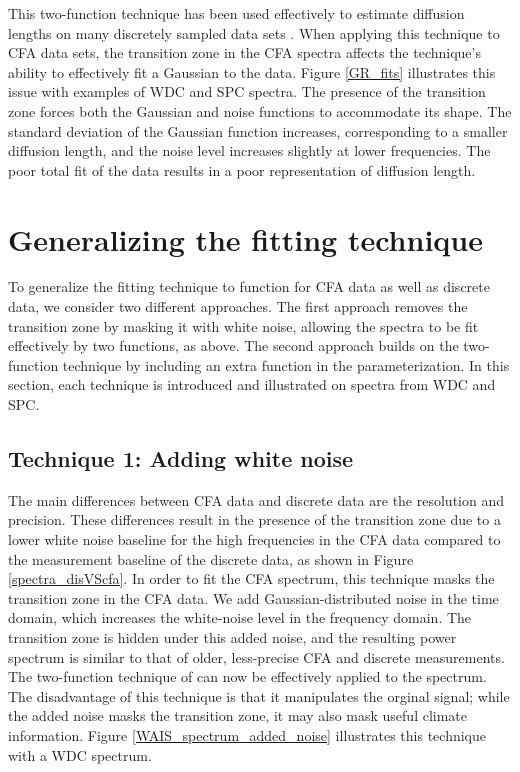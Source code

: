 \documentclass[draft, jgrga]{AGUTeX}
\begin{document}
\begin{article}
This two-function technique has been used effectively to estimate diffusion lengths on many discretely sampled data sets \citep{Gkinis2014,Holme2017}. When applying this technique to CFA data sets, the transition zone in the CFA spectra affects the technique's ability to effectively fit a Gaussian to the data. Figure \ref{GR_fits} illustrates this issue with examples of WDC and SPC spectra. The presence of the transition zone forces both the Gaussian and noise functions to accommodate its shape. The standard deviation of the Gaussian function increases, corresponding to a smaller diffusion length, and the noise level increases slightly at lower frequencies. The poor total fit of the data results in a poor representation of diffusion length.

\section{Generalizing the fitting technique}
To generalize the fitting technique to function for CFA data as well as discrete data, we consider two different approaches. The first approach removes the transition zone by masking it with white noise, allowing the spectra to be fit effectively by two functions, as above. The second approach builds on the two-function technique by including an extra function in the parameterization. In this section, each technique is introduced and illustrated on spectra from WDC and SPC.

\subsection{Technique 1: Adding white noise}
The main differences between CFA data and discrete data are the resolution and precision. These differences result in the presence of the transition zone due to a lower white noise baseline for the high frequencies in the CFA data compared to the measurement baseline of the discrete data, as shown in Figure \ref{spectra_disVScfa}. In order to fit the CFA spectrum, this technique masks the transition zone in the CFA data. We add Gaussian-distributed noise in the time domain, which increases the white-noise level in the frequency domain. The transition zone is hidden under this added noise, and the resulting power spectrum is similar to that of older, less-precise CFA and discrete measurements. The two-function technique of \citet{Gkinis2014} can now be effectively applied to the spectrum. The disadvantage of this technique is that it manipulates the orginal signal; while the added noise masks the transition zone, it may also mask useful climate information. Figure \ref{WAIS_spectrum_added_noise} illustrates this technique with a WDC spectrum.


\end{article}
\end{document}

